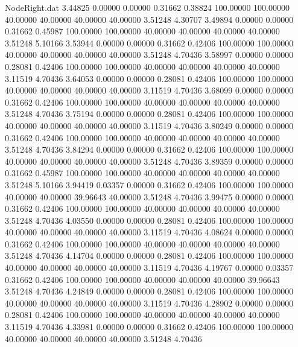 \begin{filecontents}{NodeRight.dat}
   3.44825    0.00000    0.00000     0.31662    0.38824  100.00000  100.00000   40.00000   40.00000   40.00000   40.00000    3.51248    4.30707
   3.49894    0.00000    0.00000     0.31662    0.45987  100.00000  100.00000   40.00000   40.00000   40.00000   40.00000    3.51248    5.10166
   3.53944    0.00000    0.00000     0.31662    0.42406  100.00000  100.00000   40.00000   40.00000   40.00000   40.00000    3.51248    4.70436
   3.58997    0.00000    0.00000     0.28081    0.42406  100.00000  100.00000   40.00000   40.00000   40.00000   40.00000    3.11519    4.70436
   3.64053    0.00000    0.00000     0.28081    0.42406  100.00000  100.00000   40.00000   40.00000   40.00000   40.00000    3.11519    4.70436
   3.68099    0.00000    0.00000     0.31662    0.42406  100.00000  100.00000   40.00000   40.00000   40.00000   40.00000    3.51248    4.70436
   3.75194    0.00000    0.00000     0.28081    0.42406  100.00000  100.00000   40.00000   40.00000   40.00000   40.00000    3.11519    4.70436
   3.80249    0.00000    0.00000     0.31662    0.42406  100.00000  100.00000   40.00000   40.00000   40.00000   40.00000    3.51248    4.70436
   3.84294    0.00000    0.00000     0.31662    0.42406  100.00000  100.00000   40.00000   40.00000   40.00000   40.00000    3.51248    4.70436
   3.89359    0.00000    0.00000     0.31662    0.45987  100.00000  100.00000   40.00000   40.00000   40.00000   40.00000    3.51248    5.10166
   3.94419    0.03357    0.00000     0.31662    0.42406  100.00000  100.00000   40.00000   40.00000   39.96643   40.00000    3.51248    4.70436
   3.99475    0.00000    0.00000     0.31662    0.42406  100.00000  100.00000   40.00000   40.00000   40.00000   40.00000    3.51248    4.70436
   4.03550    0.00000    0.00000     0.28081    0.42406  100.00000  100.00000   40.00000   40.00000   40.00000   40.00000    3.11519    4.70436
   4.08624    0.00000    0.00000     0.31662    0.42406  100.00000  100.00000   40.00000   40.00000   40.00000   40.00000    3.51248    4.70436
   4.14704    0.00000    0.00000     0.28081    0.42406  100.00000  100.00000   40.00000   40.00000   40.00000   40.00000    3.11519    4.70436
   4.19767    0.00000    0.03357     0.31662    0.42406  100.00000  100.00000   40.00000   40.00000   40.00000   39.96643    3.51248    4.70436
   4.24849    0.00000    0.00000     0.28081    0.42406  100.00000  100.00000   40.00000   40.00000   40.00000   40.00000    3.11519    4.70436
   4.28902    0.00000    0.00000     0.28081    0.42406  100.00000  100.00000   40.00000   40.00000   40.00000   40.00000    3.11519    4.70436
   4.33981    0.00000    0.00000     0.31662    0.42406  100.00000  100.00000   40.00000   40.00000   40.00000   40.00000    3.51248    4.70436

\end{filecontents}
